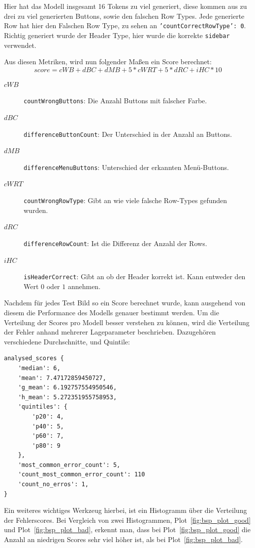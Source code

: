\documentclass[pdftex,a4paper,halfparskip, article]{scrartcl}
\begin{document}
Hier hat das Modell insgesamt 16 Tokens zu viel generiert, diese kommen aus zu drei zu viel generierten Buttons, sowie den falschen Row Types. Jede generierte Row hat hier den Falschen Row Type, zu sehen an \texttt{'countCorrectRowType': 0}. Richtig generiert wurde der Header Type, hier wurde die korrekte \texttt{sidebar} verwendet.

Aus diesen Metriken, wird nun folgender Maßen ein Score berechnet:        
\begin{equation}
score = cWB + dBC + dMB + 5 * cWRT + 5 * dRC + iHC * 10
\end{equation}

\begin{description}
	\item[$cWB$] \texttt{countWrongButtons}: Die Anzahl Buttons mit falscher Farbe.
	\item[$dBC$] \texttt{differenceButtonCount}: Der Unterschied in der Anzahl an Buttons.
	\item[$dMB$] \texttt{differenceMenuButtons}: Unterschied der erkannten Menü-Buttons.
	\item[$cWRT$] \texttt{countWrongRowType}: Gibt an wie viele falsche Row-Types gefunden wurden.
	\item[$dRC$] \texttt{differenceRowCount}: Ist die Differenz der Anzahl der Rows.
	\item[$iHC$] \texttt{isHeaderCorrect}: Gibt an ob der Header korrekt ist. Kann entweder den Wert $0$ oder $1$ annehmen.	
\end{description}

Nachdem für jedes Test Bild so ein Score berechnet wurde, kann ausgehend von diesem die Performance des Modells genauer bestimmt werden. Um die Verteilung der Scores pro Modell besser verstehen zu können, wird die Verteilung der Fehler anhand mehrerer Lageparameter beschrieben. Dazugehören verschiedene Durchschnitte, und Quintile:

  \begin{verbatim}
analysed_scores {
    'median': 6, 
    'mean': 7.47172859450727, 
    'g_mean': 6.192757554950546, 
    'h_mean': 5.272351955758953, 
    'quintiles': {
        'p20': 4,
        'p40': 5, 
        'p60': 7, 
        'p80': 9 
	},
    'most_common_error_count': 5, 
    'count_most_common_error_count': 110
    'count_no_erros': 1, 
}
 \end{verbatim}


Ein weiteres wichtiges Werkzeug hierbei, ist ein Histogramm über die Verteilung der Fehlerscores. Bei Vergleich von zwei Histogrammen, Plot~\ref{fig:bsp_plot_good} und Plot~\ref{fig:bsp_plot_bad}, erkennt man, dass bei Plot~\ref{fig:bsp_plot_good} die Anzahl an niedrigen Scores sehr viel höher ist, als bei Plot~\ref{fig:bsp_plot_bad}.
\end{document}

